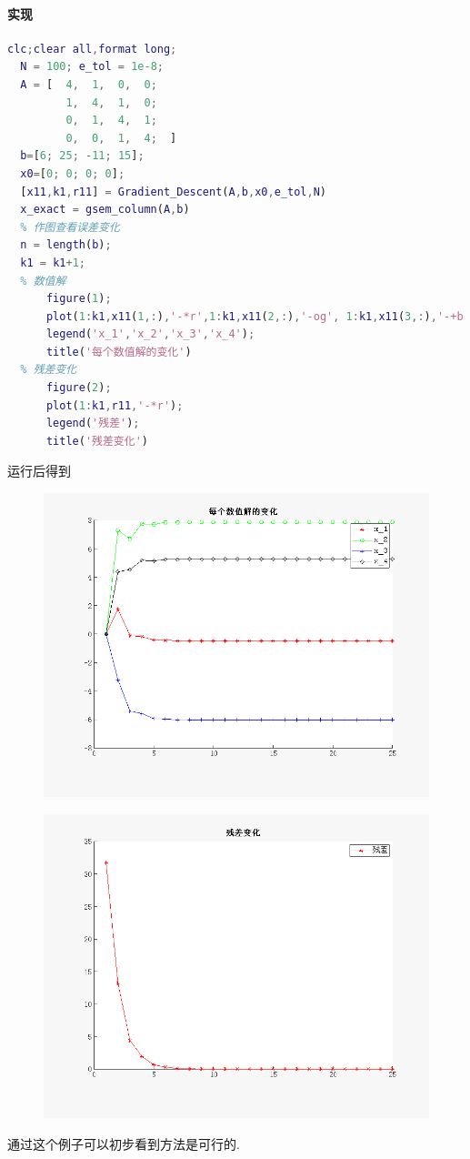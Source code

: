 \documentclass{xtupaper}
\begin{document}
\paragraph{实现}
\begin{lstlisting}[language=matlab]
  clc;clear all,format long;
  N = 100; e_tol = 1e-8;
  A = [  4,  1,  0,  0; 
         1,  4,  1,  0;  
         0,  1,  4,  1; 
         0,  0,  1,  4;  ]
  b=[6; 25; -11; 15];
  x0=[0; 0; 0; 0];
  [x11,k1,r11] = Gradient_Descent(A,b,x0,e_tol,N)
  x_exact = gsem_column(A,b)
  % 作图查看误差变化
  n = length(b);
  k1 = k1+1;
  % 数值解
      figure(1);
      plot(1:k1,x11(1,:),'-*r',1:k1,x11(2,:),'-og', 1:k1,x11(3,:),'-+b',1:k1,x11(4,:),'-dk');
      legend('x_1','x_2','x_3','x_4');
      title('每个数值解的变化')
  % 残差变化
      figure(2);
      plot(1:k1,r11,'-*r');
      legend('残差');
      title('残差变化')
\end{lstlisting}
运行后得到
\begin{figure}[ht]
  \centering
  \includegraphics[scale=0.5]{../figures/fig1.png}
  \caption{}
\end{figure}

\begin{figure}[ht]
  \centering
  \includegraphics[scale=0.5]{../figures/fig2.png}
  \caption{}
\end{figure}
通过这个例子可以初步看到方法是可行的. 
\end{document}
